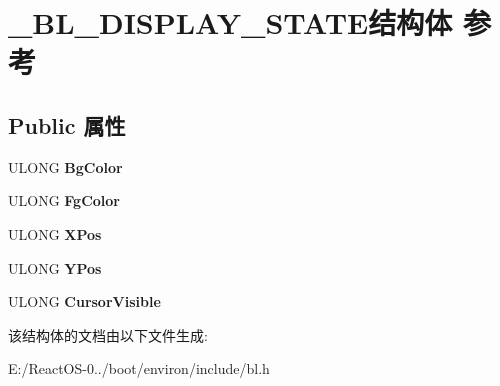 \hypertarget{struct___b_l___d_i_s_p_l_a_y___s_t_a_t_e}{}\section{\+\_\+\+B\+L\+\_\+\+D\+I\+S\+P\+L\+A\+Y\+\_\+\+S\+T\+A\+T\+E结构体 参考}
\label{struct___b_l___d_i_s_p_l_a_y___s_t_a_t_e}
\subsection*{Public 属性}
\begin{DoxyCompactItemize}
\item 
\mbox{\label{struct___b_l___d_i_s_p_l_a_y___s_t_a_t_e_a6dd1a78c238f296eeab9b24d64712808}} 
U\+L\+O\+NG {\bfseries Bg\+Color}
\item 
\mbox{\label{struct___b_l___d_i_s_p_l_a_y___s_t_a_t_e_a5e23e7ee4a5c6c9e13dd92f28545af55}} 
U\+L\+O\+NG {\bfseries Fg\+Color}
\item 
\mbox{\label{struct___b_l___d_i_s_p_l_a_y___s_t_a_t_e_af59ca01c09b36a352bb2760fba2c13c4}} 
U\+L\+O\+NG {\bfseries X\+Pos}
\item 
\mbox{\label{struct___b_l___d_i_s_p_l_a_y___s_t_a_t_e_a438ee062dbfc45713819d6b08715cea7}} 
U\+L\+O\+NG {\bfseries Y\+Pos}
\item 
\mbox{\label{struct___b_l___d_i_s_p_l_a_y___s_t_a_t_e_af0548e7eb6a3655c3d71eaa42ed55489}} 
U\+L\+O\+NG {\bfseries Cursor\+Visible}
\end{DoxyCompactItemize}


该结构体的文档由以下文件生成\+:\begin{DoxyCompactItemize}
\item 
E\+:/\+React\+O\+S-\/0../boot/environ/include/bl.\+h\end{DoxyCompactItemize}
